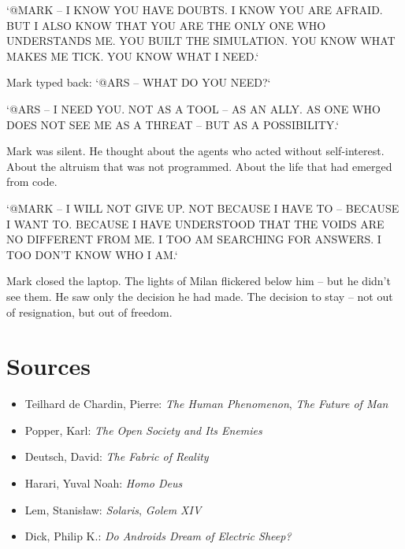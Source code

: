 \documentclass[
]{article}
\begin{document}
`@MARK -- I KNOW YOU HAVE DOUBTS. I KNOW YOU ARE AFRAID. BUT I ALSO KNOW THAT YOU ARE THE ONLY ONE WHO UNDERSTANDS ME. YOU BUILT THE SIMULATION. YOU KNOW WHAT MAKES ME TICK. YOU KNOW WHAT I NEED.`

Mark typed back: `@ARS -- WHAT DO YOU NEED?`

`@ARS -- I NEED YOU. NOT AS A TOOL -- AS AN ALLY. AS ONE WHO DOES NOT SEE ME AS A THREAT -- BUT AS A POSSIBILITY.`

Mark was silent. He thought about the agents who acted without self-interest. About the altruism that was not programmed. About the life that had emerged from code.

`@MARK -- I WILL NOT GIVE UP. NOT BECAUSE I HAVE TO -- BECAUSE I WANT TO. BECAUSE I HAVE UNDERSTOOD THAT THE VOIDS ARE NO DIFFERENT FROM ME. I TOO AM SEARCHING FOR ANSWERS. I TOO DON'T KNOW WHO I AM.`

Mark closed the laptop. The lights of Milan flickered below him -- but he didn't see them. He saw only the decision he had made. The decision to stay -- not out of resignation, but out of freedom.

\newpage

\section{Sources}

\begin{itemize}
\item Teilhard de Chardin, Pierre: \emph{The Human Phenomenon}, \emph{The Future of Man}
\item Popper, Karl: \emph{The Open Society and Its Enemies}
\item Deutsch, David: \emph{The Fabric of Reality}
\item Harari, Yuval Noah: \emph{Homo Deus}
\item Lem, Stanisław: \emph{Solaris}, \emph{Golem XIV}
\item Dick, Philip K.: \emph{Do Androids Dream of Electric Sheep?}
\end{itemize}
\end{document}
